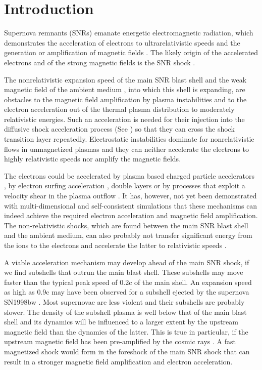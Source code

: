 \documentclass[structabstract]{aa}
\begin{document}
\section{Introduction}
Supernova remnants (SNRs) emanate energetic electromagnetic radiation,
which demonstrates the acceleration of electrons to ultrarelativistic speeds 
\citep{RelEl1,Radiation} and the generation or amplification of magnetic 
fields \citep{MagAmp1,MagAmp2}. The likely origin of the accelerated 
electrons and of the strong magnetic fields is the SNR shock
\citep{Marco1,Marco2}.

The nonrelativistic expansion speed of the main SNR blast shell 
\citep{Shockspeed1,Shockspeed2} and the weak magnetic field of the ambient 
medium \citep{MagAmp2}, into which this shell is expanding, are obstacles 
to the magnetic field amplification by plasma instabilities and to the
electron acceleration out of the thermal plasma distribution to moderately 
relativistic energies. Such an acceleration is needed for their injection 
\citep{Injection1,Injection2,Injection3,Gyrosurf} into the diffusive 
shock acceleration process (See \citet{Diffus}) so that they can cross 
the shock transition layer repeatedly. Electrostatic instabilities dominate 
for nonrelativistic flows in unmagnetized plasmas \citep{Bret,BRETAPJ} and 
they can neither accelerate the electrons to highly relativistic speeds 
\citep{Sircombe} nor amplify the magnetic fields.  

The electrons could be accelerated by plasma based charged particle 
accelerators \citep{PlAc}, by electron surfing acceleration 
\citep{Surfing1,Surfing2,Surfing3}, double layers \citep{DL2,DL1} or 
by processes that exploit a velocity shear in the plasma outflow 
\citep{Shear}. It has, however, not yet been demonstrated with 
multi-dimensional and self-consistent simulations that these 
mechanisms can indeed achieve the required electron acceleration and 
magnetic field amplification. The non-relativistic shocks, which are 
found between the main SNR blast shell and the ambient medium, can 
also probably not transfer significant energy from the ions to the 
electrons and accelerate the latter to relativistic speeds 
\citep{Shock4,Shock6,Shock5,Shock3,Sorasio,Shock2,Shock7}.

A viable acceleration mechanism may develop ahead of the main SNR shock, 
if we find subshells that outrun the main blast shell. These subshells may 
move faster than the typical peak speed of 0.2c of the main shell. An 
expansion speed as high as 0.9c may have been observed for a subshell 
ejected by the supernova SN1998bw \citep{Shockspeed1}. Most supernovae 
are less violent and their subshells are probably slower. The 
density of the subshell plasma is well below that of the main blast shell 
and its dynamics will be influenced to a larger extent by the upstream 
magnetic field than the dynamics of the latter. This is true in particular, 
if the upstream magnetic field has been pre-amplified by the cosmic rays 
\citep{Winske,MagAmp3,MagAmp4,Pohl,Riq}. A fast magnetized shock would 
form in the foreshock of the main SNR shock that can result in a 
stronger magnetic field amplification and electron acceleration. 
\end{document}
